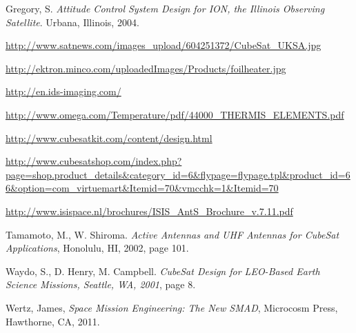 \documentclass[12pt]{article}
\begin{document}
\begin{thebibliography}{9}
Gregory, S. \emph{Attitude Control System Design for ION, the Illinois Observing Satellite}. Urbana, Illinois, 2004.

\url{http://www.satnews.com/images_upload/604251372/CubeSat_UKSA.jpg}

\url{http://ektron.minco.com/uploadedImages/Products/foilheater.jpg}

\url{http://en.ids-imaging.com/}

\url{http://www.omega.com/Temperature/pdf/44000_THERMIS_ELEMENTS.pdf}


\url{http://www.cubesatkit.com/content/design.html}

\url{http://www.cubesatshop.com/index.php?page=shop.product_details&category_id=6&flypage=flypage.tpl&product_id=66&option=com_virtuemart&Itemid=70&vmcchk=1&Itemid=70}

\url{http://www.isispace.nl/brochures/ISIS_AntS_Brochure_v.7.11.pdf}

Tamamoto, M., W. Shiroma. \emph{Active Antennas and UHF Antennas for CubeSat Applications}, Honolulu, HI, 2002, page 101.

Waydo, S., D. Henry, M. Campbell. \emph{CubeSat Design for LEO-Based Earth Science Missions, Seattle, WA, 2001}, page 8.





Wertz, James, \emph{Space Mission Engineering: The New SMAD}, Microcosm Press, Hawthorne, CA, 2011.


\end{thebibliography}
\end{document}
